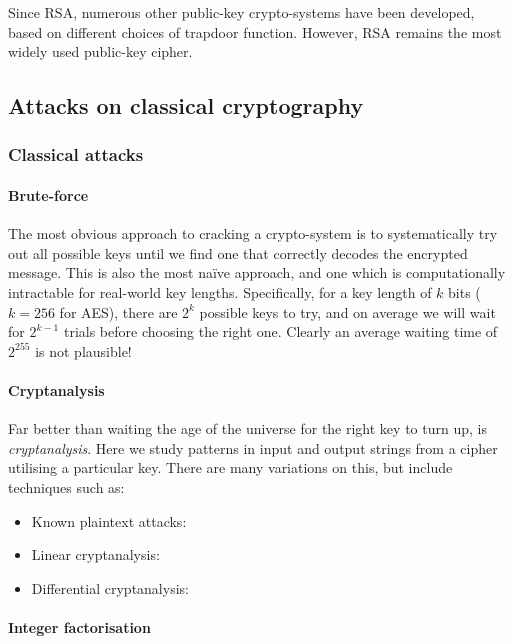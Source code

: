 Since RSA, numerous other public-key crypto-systems have been developed, based on different choices of trapdoor function. However, RSA remains the most widely used public-key cipher.

\subsection{Attacks on classical cryptography}\label{sec:attacks_on_class}

\subsubsection{Classical attacks}

\paragraph{Brute-force}\label{sec:brute_force_attack}

The most obvious approach to cracking a crypto-system is to systematically try out all possible keys until we find one that correctly decodes the encrypted message. This is also the most na\"ive approach, and one which is computationally intractable for real-world key lengths. Specifically, for a key length of $k$ bits (\mbox{$k=256$} for AES), there are $2^k$ possible keys to try, and on average we will wait for $2^{k-1}$ trials before choosing the right one. Clearly an average waiting time of $2^{255}$ is not plausible!

\paragraph{Cryptanalysis}

Far better than waiting the age of the universe for the right key to turn up, is \textit{cryptanalysis}. Here we study patterns in input and output strings from a cipher utilising a particular key. There are many variations on this, but include techniques such as:
\begin{itemize}
	\item Known plaintext attacks: 
	\item Linear cryptanalysis: 
	\item Differential cryptanalysis: 
\end{itemize}
 
\paragraph{Integer factorisation}

